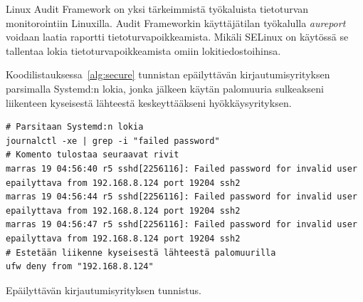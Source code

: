 Linux Audit Framework on yksi tärkeimmistä työkaluista tietoturvan monitorointiin Linuxilla. Audit Frameworkin käyttäjätilan työkalulla \textit{aureport} voidaan laatia raportti tietoturvapoikkeamista. Mikäli SELinux on käytössä se tallentaa lokia tietoturvapoikkeamista omiin lokitiedostoihinsa.~\cite{xplg}

Koodilistauksessa~\ref{alg:secure} tunnistan epäilyttävän kirjautumisyrityksen parsimalla Systemd:n lokia, jonka jälkeen käytän palomuuria sulkeakseni liikenteen kyseisestä lähteestä keskeyttääkseni hyökkäysyrityksen.

\begin{algorithm}[tbh]
\begin{verbatim}
# Parsitaan Systemd:n lokia
journalctl -xe | grep -i "failed password"
# Komento tulostaa seuraavat rivit
marras 19 04:56:40 r5 sshd[2256116]: Failed password for invalid user
epailyttava from 192.168.8.124 port 19204 ssh2
marras 19 04:56:44 r5 sshd[2256116]: Failed password for invalid user
epailyttava from 192.168.8.124 port 19204 ssh2
marras 19 04:56:47 r5 sshd[2256116]: Failed password for invalid user
epailyttava from 192.168.8.124 port 19204 ssh2
# Estetään liikenne kyseisestä lähteestä palomuurilla
ufw deny from "192.168.8.124"
\end{verbatim}
\caption{Epäilyttävän kirjautumisyrityksen tunnistus.\label{alg:secure}}
\end{algorithm}
